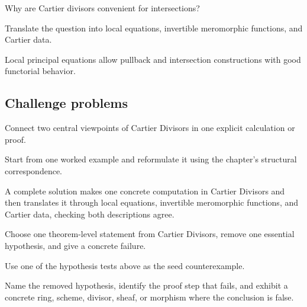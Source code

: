 \begin{exercise}\label{exr:vi40-expand-14}
Why are Cartier divisors convenient for intersections?
\end{exercise}
\begin{hint}
Translate the question into local equations, invertible meromorphic functions, and Cartier data.
\end{hint}
\begin{solution}
Local principal equations allow pullback and intersection constructions with good functorial behavior.
\end{solution}

\subsection*{Challenge problems}

\begin{exercise}\label{exr:vi40-expand-15}
Connect two central viewpoints of Cartier Divisors in one explicit calculation or proof.
\end{exercise}
\begin{hint}
Start from one worked example and reformulate it using the chapter's structural correspondence.
\end{hint}
\begin{solution}
A complete solution makes one concrete computation in Cartier Divisors and then translates it through local equations, invertible meromorphic functions, and Cartier data, checking both descriptions agree.
\end{solution}

\begin{exercise}\label{exr:vi40-expand-16}
Choose one theorem-level statement from Cartier Divisors, remove one essential hypothesis, and give a concrete failure.
\end{exercise}
\begin{hint}
Use one of the hypothesis tests above as the seed counterexample.
\end{hint}
\begin{solution}
Name the removed hypothesis, identify the proof step that fails, and exhibit a concrete ring, scheme, divisor, sheaf, or morphism where the conclusion is false.
\end{solution}

